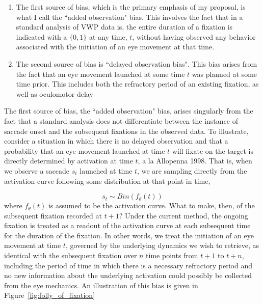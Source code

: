 \documentclass{article}
\begin{document}
\begin{singlespace}
\begin{enumerate}
\vspace{-3mm}
\item The first source of bias, which is the primary emphasis of my proposal, is what I call the ``added observation" bias. This involves the fact that in  a standard analysis of VWP data is, the entire duration of a fixation is indicated with a $\{0,1\}$  at any time, $t$, without having observed any behavior associated with the initiation of an eye movement at that time.
\item The second source of bias is ``delayed observation bias". This bias arises from the fact that an eye movement launched at some time $t$ was planned at some time prior. This includes both the refractory period of an existing fixation, as well as oculomotor delay
\end{enumerate}
\end{singlespace}

The first source of bias, the ``added observation" bias, arises singularly from the fact that a standard analysis does not differentiate between the instance of saccade onset and the subsequent fixations in the observed data. To illustrate, consider a situation in which there is no delayed observation and that a probability that an eye movement launched at time $t$ will fixate on the target is directly determined by activation at time $t$, a la Allopenna 1998. That is, when we observe a saccade $s_t$ launched at time $t$, we are sampling directly from the activation curve following some distribution at that point in time, 

\begin{equation} \label{eq:saccade_dist}
s_t \sim Bin(f_{\theta}(t))
\end{equation}
where $f_{\theta}(t)$ is assumed to be the activation curve. What to make, then, of the subsequent fixation recorded at $t+1$? Under the current method, the ongoing fixation is treated as a readout of the activation curve at each subsequent time for the duration of the fixation. In other words, we treat the initiation of an eye movement at time $t$, governed by the underlying dynamics we wish to retrieve, as identical with the subsequent fixation over $n$ time points from $t+1$ to $t+n$, including the period of time in which there is a necessary refractory period and no new information about the underlying activation could possibly be collected from the eye mechanics. An illustration of this bias is given in Figure~\ref{fig:folly_of_fixation}
\end{document}
